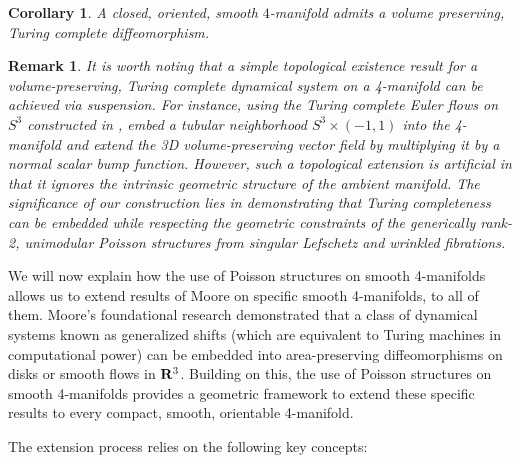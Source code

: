 \documentclass{amsart}
\newtheorem{Corollary}[Theorem]{Corollary}
\newtheorem{Remark}{Remark}
\begin{document}
 \begin{Corollary} \label{cor:TCvol-pres-flow-4-mfds}
A closed, oriented, smooth $4$-manifold admits a volume preserving, Turing complete diffeomorphism. 
\end{Corollary}
 


\begin{Remark}
It is worth noting that a simple topological existence result for a volume-preserving, Turing complete dynamical system on a 4-manifold can be achieved via suspension. 
For instance, using the Turing complete Euler flows on $S^3$ constructed in \cite{CMPP21}, embed a tubular neighborhood $S^3 \times (-1,1)$ into the 4-manifold and extend the 3D volume-preserving vector field by multiplying it by a normal scalar bump function.
However, such a topological extension is artificial in that it ignores the intrinsic geometric structure of the ambient manifold. 
The significance of our construction lies in demonstrating that Turing completeness can be embedded while respecting the geometric constraints of the generically rank-2, unimodular Poisson structures from singular Lefschetz and wrinkled fibrations.
\end{Remark}

We will now explain how the use of Poisson structures on smooth 4-manifolds allows us to extend results of Moore on specific smooth 4-manifolds, to all of them.
Moore’s foundational research demonstrated that a class of dynamical systems known as generalized shifts (which are equivalent to Turing machines in computational power) can be embedded into area-preserving diffeomorphisms on disks or smooth flows in ${\bf R}^3$.
Building on this, the use of Poisson structures on smooth 4-manifolds provides a geometric framework to extend these specific results to every compact, smooth, orientable 4-manifold.

The extension process relies on the following key concepts:
 
\end{document}
